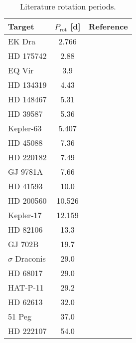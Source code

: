 \begin{table*}
\centering
\begin{tabular}{lcr}
Target & $P_\mathrm{rot}$ [d] & Reference \\ \hline
EK Dra & 2.766 & \citet{Waite2017} \\
HD 175742 & 2.88 & \citet{Rutten1987} \\
EQ Vir & 3.9 & \citet{Suarez2016} \\
HD 134319 & 4.43 & \citet{Wright2011} \\
HD 148467 & 5.31 & \citet{Houdebine2016} \\
HD 39587 & 5.36 & \citet{Wright2011} \\
Kepler-63 & 5.407 & \citet{McQuillan2013} \\
HD 45088 & 7.36 & \citet{Rutten1987} \\
HD 220182 & 7.49 & \citet{Wright2011} \\
GJ 9781A & 7.66 & \citet{Houdebine2016} \\
HD 41593 & 10.0 & \citet{Isaacson2010} \\
HD 200560 & 10.526 & \citet{Strassmeier2000} \\
Kepler-17 & 12.159 & \citet{McQuillan2013} \\
HD 82106 & 13.3 & \citet{Pizzolato2003} \\
GJ 702B & 19.7 & \citet{Wright2011} \\
$\sigma$ Draconis & 29.0 & \citet{Pizzolato2003} \\
HD 68017 & 29.0 & \citet{Isaacson2010} \\
HAT-P-11 & 29.2 & \citet{Morris2017a} \\
HD 62613 & 32.0 & \citet{Isaacson2010} \\
51 Peg & 37.0 & \citet{Wright2011} \\
HD 222107 & 54.0 & \citet{Rutten1987}
\end{tabular}
\caption{Literature rotation periods. \label{tab:rotation}}
\end{table*}
